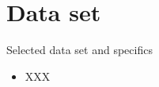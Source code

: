 \section{Data set}

\begin{frame}[c]{Selected data set and specifics}
    \begin{minipage}{0.55\textwidth}
        \begin{itemize}
            \item XXX
        \end{itemize}
    \end{minipage}
\end{frame}
